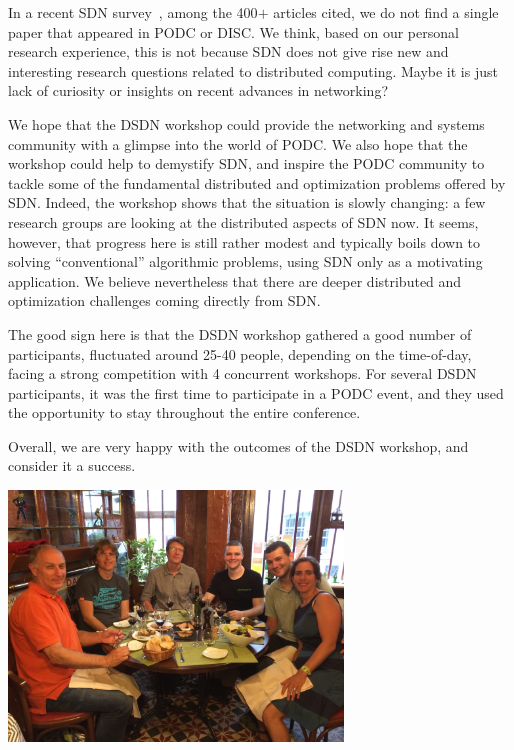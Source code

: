 \documentclass[11pt,pdftex,letter]{article}
\begin{document}
In a recent SDN survey~\cite{sdn-survey}, among the 400$+$ articles cited,
we do not find
a single paper that appeared in PODC or DISC.
We think, based on our personal research experience, this is not
because SDN does not give rise new and interesting
research questions related to distributed computing.
Maybe it is just lack of curiosity or insights on recent
advances in networking?

We hope that the DSDN workshop could
provide the networking and systems community with a glimpse into the
world of PODC. We also hope that the workshop could help to demystify
SDN, and inspire the PODC community
to tackle some of the fundamental distributed and
optimization problems offered by SDN.
Indeed, the workshop shows that the situation is slowly changing: a few
research groups are looking at the distributed aspects of SDN now.
It seems, however, that progress here is still rather modest and
typically boils down to solving ``conventional'' algorithmic problems,
using SDN only as a motivating application. We believe nevertheless that
there are deeper distributed and optimization challenges coming directly from SDN.

The good sign here is that the DSDN workshop gathered a good number of participants,
fluctuated around 25-40 people, depending on the time-of-day, facing
a strong competition with 4 concurrent workshops.
For several DSDN participants, it was the first time
to participate in a PODC event, and they used the opportunity
to stay throughout the entire conference.

Overall, we are very happy with the outcomes of the DSDN workshop, and consider it
a success.


\begin{center}
\includegraphics[width=3.5in]{dinner.jpg}
\end{center}


\end{document}
